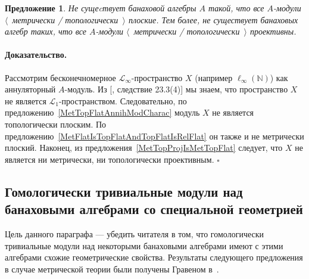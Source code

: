 \documentclass[12pt]{article}
\newtheorem{proposition}[theorem]{Предложение}
\renewenvironment{proof}{\paragraph{Доказательство.}}{\hfill$\square$\medskip}
\begin{document}
\begin{proposition} Не сущеcтвует банаховой алгебры $A$ такой, что все
    $A$-модули $\langle$~метрически / топологически~$\rangle$ плоские. Тем
    более, не существует банаховых алгебр таких, что все $A$-модули
    $\langle$~метрически / топологически~$\rangle$ проективны.
\end{proposition}
\begin{proof} Рассмотрим бесконечномерное $\mathscr{L}_\infty$-пространство $X$
    (например $\ell_\infty(\mathbb{N})$) как аннуляторный $A$-модуль. Из
    [\cite{DefFloTensNorOpId}, следствие 23.3(4)] мы знаем, что пространство $X$
    не является $\mathscr{L}_1$-пространством. Следовательно, по
    предложению~\ref{MetTopFlatAnnihModCharac} модуль $X$ не является
    топологически плоским. По
    предложению~\ref{MetFlatIsTopFlatAndTopFlatIsRelFlat} он также и не
    метрически плоский. Наконец, из предложения~\ref{MetTopProjIsMetTopFlat}
    следует, что $X$ не является ни метрически, ни топологически проективным.
\end{proof}


\subsection{
    Гомологически тривиальные модули над банаховыми алгебрами со
    специальной геометрией
}\label{
    SubSectionHomologicallyTrivialModulesOverBanachAlgebrasWithSpecificGeometry
}

Цель данного параграфа --- убедить читателя в том, что гомологически тривиальные
модули над некоторыми банаховыми алгебрами имеют с этими алгебрами схожие
геометрические свойства. Результаты следующего предложения в случае метрической
теории были получены Гравеном в~\cite{GravInjProjBanMod}.
\end{document}
